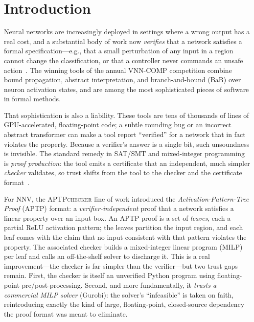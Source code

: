 \documentclass[runningheads]{llncs}
\newcommand{\pytool}{\textsc{APTPchecker}}
\newcommand{\relu}{\ensuremath{\mathrm{ReLU}}}
\begin{document}
\section{Introduction}\label{sec:intro}

Neural networks are increasingly deployed in settings where a wrong output has a
real cost, and a substantial body of work now \emph{verifies} that a network
satisfies a formal specification---e.g., that a small perturbation of any input in
a region cannot change the classification, or that a controller never commands an
unsafe action~\cite{katz2017reluplex,wang2021betacrown,vnncomp2023}. The winning
tools of the annual VNN-COMP competition combine bound propagation, abstract
interpretation, and branch-and-bound (BaB) over neuron activation states, and are
among the most sophisticated pieces of software in formal methods.

That sophistication is also a liability. These tools are tens of thousands of
lines of GPU-accelerated, floating-point code; a subtle rounding bug or an
incorrect abstract transformer can make a tool report ``verified'' for a network
that in fact violates the property. Because a verifier's answer is a single bit,
such unsoundness is invisible. The standard remedy in SAT/SMT and mixed-integer
programming is \emph{proof production}: the tool emits a certificate that an
independent, much simpler \emph{checker} validates, so trust shifts from the tool
to the checker and the certificate
format~\cite{isac2022marabou,cheung2017vipr,eifler2022exact}.

For NNV, the \pytool{} line of work introduced the
\emph{Activation-Pattern-Tree Proof} (APTP) format: a \emph{verifier-independent}
proof that a network satisfies a linear property over an input box. An APTP proof
is a set of \emph{leaves}, each a partial \relu{} activation pattern; the leaves
partition the input region, and each leaf comes with the claim that no input
consistent with that pattern violates the property. The associated checker builds
a mixed-integer linear program (MILP) per leaf and calls an off-the-shelf solver
to discharge it. This is a real improvement---the checker is far simpler than the
verifier---but two trust gaps remain. First, the checker is itself an unverified
Python program using floating-point pre/post-processing. Second, and more
fundamentally, it \emph{trusts a commercial MILP solver} (Gurobi): the solver's
``infeasible'' is taken on faith, reintroducing exactly the kind of large,
floating-point, closed-source dependency the proof format was meant to eliminate.
\end{document}
